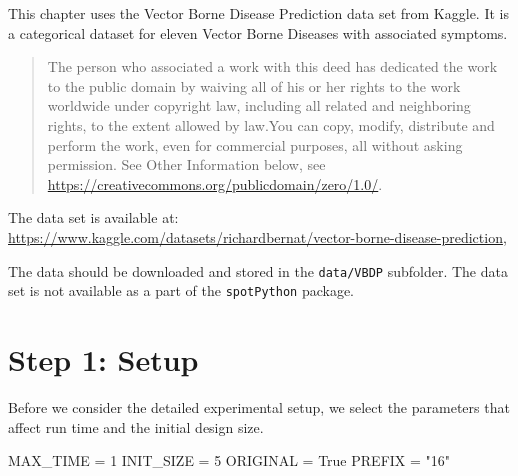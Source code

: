 \documentclass[
  letterpaper,
  DIV=11,
  numbers=noendperiod]{scrreprt}
\newenvironment{Shaded}{\begin{snugshade}}{\end{snugshade}}
\newcommand{\DecValTok}[1]{\textcolor[rgb]{0.68,0.00,0.00}{#1}}
\newcommand{\NormalTok}[1]{\textcolor[rgb]{0.00,0.23,0.31}{#1}}
\newcommand{\OperatorTok}[1]{\textcolor[rgb]{0.37,0.37,0.37}{#1}}
\newcommand{\StringTok}[1]{\textcolor[rgb]{0.13,0.47,0.30}{#1}}
\newcommand{\VariableTok}[1]{\textcolor[rgb]{0.07,0.07,0.07}{#1}}
\begin{document}
\begin{tcolorbox}[enhanced jigsaw, rightrule=.15mm, opacityback=0, colframe=quarto-callout-important-color-frame, opacitybacktitle=0.6, toptitle=1mm, arc=.35mm, colbacktitle=quarto-callout-important-color!10!white, coltitle=black, toprule=.15mm, leftrule=.75mm, titlerule=0mm, title=\textcolor{quarto-callout-important-color}{\faExclamation}\hspace{0.5em}{Vector Borne Disease Prediction Data Set}, bottomrule=.15mm, breakable, bottomtitle=1mm, left=2mm, colback=white]

This chapter uses the Vector Borne Disease Prediction data set from
Kaggle. It is a categorical dataset for eleven Vector Borne Diseases
with associated symptoms.

\begin{quote}
The person who associated a work with this deed has dedicated the work
to the public domain by waiving all of his or her rights to the work
worldwide under copyright law, including all related and neighboring
rights, to the extent allowed by law.You can copy, modify, distribute
and perform the work, even for commercial purposes, all without asking
permission. See Other Information below, see
\url{https://creativecommons.org/publicdomain/zero/1.0/}.
\end{quote}

The data set is available at:
\url{https://www.kaggle.com/datasets/richardbernat/vector-borne-disease-prediction},

The data should be downloaded and stored in the \texttt{data/VBDP}
subfolder. The data set is not available as a part of the
\texttt{spotPython} package.

\end{tcolorbox}

\hypertarget{sec-setup-16}{%
\section{Step 1: Setup}\label{sec-setup-16}}

Before we consider the detailed experimental setup, we select the
parameters that affect run time and the initial design size.

\begin{Shaded}
\begin{Highlighting}[]
\NormalTok{MAX\_TIME }\OperatorTok{=} \DecValTok{1}
\NormalTok{INIT\_SIZE }\OperatorTok{=} \DecValTok{5}
\NormalTok{ORIGINAL }\OperatorTok{=} \VariableTok{True}
\NormalTok{PREFIX }\OperatorTok{=} \StringTok{"16"}
\end{Highlighting}
\end{Shaded}
\end{document}
